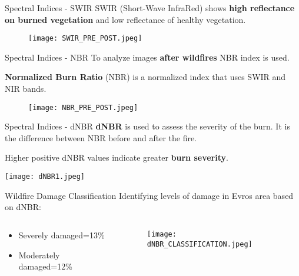 \documentclass{beamer}
\begin{document}
\begin{frame}{Spectral Indices -  SWIR}
SWIR (Short-Wave InfraRed) shows \textbf{high reflectance on burned vegetation} and low reflectance of healthy vegetation.

 \bigskip
 
 \begin{figure}
    \centering
    \texttt{[image: SWIR\_PRE\_POST.jpeg]}
   \end{figure}
\end{frame}

\begin{frame}{Spectral Indices - NBR}
 To analyze images \textbf{after wildfires} NBR index is used.

\bigskip
 \textbf{Normalized Burn Ratio} (NBR) is a normalized index that uses SWIR and NIR bands.

 \begin{figure}
    \centering
    \texttt{[image: NBR\_PRE\_POST.jpeg]}
   \end{figure}
\end{frame}

\begin{frame}{Spectral Indices - dNBR}
\textbf{dNBR} is used to assess the severity of the burn. It is the difference between NBR before and after the fire.

\bigskip
Higher positive dNBR values indicate greater \textbf{burn severity}.

\begin{center}
     \centering
     \texttt{[image: dNBR1.jpeg]}
 \end{center} 
\end{frame}

\begin{frame}{Wildfire Damage Classification}
 \centering Identifying levels of damage in Evros area based on dNBR:
 
 \begin{columns}
    \begin{column}[t]{0.30\textwidth}
       \centering
       \bigskip
       \bigskip
       \bigskip
        \begin{itemize}
         \item Severely damaged=13\%
         \item Moderately damaged=12\%
        \end{itemize}
    \end{column} 

    \begin{column}[t]{0.80\textwidth}
            \centering
            \begin{figure}
            \texttt{[image: dNBR\_CLASSIFICATION.jpeg]}  
            \end{figure}
    \end{column} 
\end{columns}
\end{frame}
\end{document}
